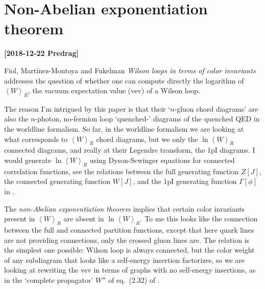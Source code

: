

\section{Non-Abelian exponentiation theorem}
\label{s:FiMaFu18}
\newcommand{\vev}[1]{{\left< {#1} \right>}}

{\bf [2018-12-22 Predrag]}

Fiol, Martínez-Montoya and Fukelman {\em Wilson loops in
terms of color invariants} addresses the question of whether one can
compute directly the logarithm of $\vev{W}_R$, the vacuum expectation
value (vev) of a Wilson loop.

The reason I'm intrigued by this paper is that their `$n$-gluon chord
diagrams' are also the $n$-photon, no-fermion loop `quenched-'
diagrams
of the quenched QED in the worldline formalism. So far, in the worldline
formalism we are looking at what corresponds to $\vev{W}_R$ chord
diagrams, but we only the $\ln \vev{W}_R$ connected diagrams, and really
at their Legendre transform, the 1pI diagrams. I would generate $\ln
\vev{W}_R$ using Dyson-Scwinger equations for connected correlation
functions, see the relations between the full generating function $Z[J]$,
the connected generating function $W[J]$, and the 1pI generating function
$\Gamma[\phi]$ in .

The \emph{non-Abelian exponentiation theorem} implies that certain color
invariants present in $\vev{W}_R$ are absent in $\ln \vev{W}_R$.
To me this looks like the connection between the full and connected
partition functions, except that here quark lines are not providing
connections, only the crossed gluon lines are. The relation is the simplest one
possible: Wilson loop is always connected, but the color weight
of any subdiagram that looks like a self-energy insertion factorizes,
so we are looking at rewriting the vev in terms of graphs with no
self-energy insertions, as in the `complete propagator' $W''$ of eq.~(2.32)
of .


